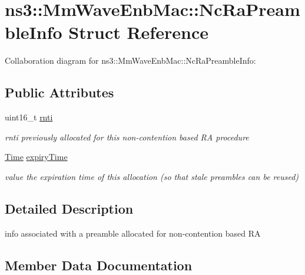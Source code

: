 \hypertarget{structns3_1_1MmWaveEnbMac_1_1NcRaPreambleInfo}{}\section{ns3\+:\+:Mm\+Wave\+Enb\+Mac\+:\+:Nc\+Ra\+Preamble\+Info Struct Reference}
\label{structns3_1_1MmWaveEnbMac_1_1NcRaPreambleInfo}


Collaboration diagram for ns3\+:\+:Mm\+Wave\+Enb\+Mac\+:\+:Nc\+Ra\+Preamble\+Info\+:
\subsection*{Public Attributes}
\begin{DoxyCompactItemize}
\item 
uint16\+\_\+t \hyperlink{structns3_1_1MmWaveEnbMac_1_1NcRaPreambleInfo_a7dfb57ed2aefe13ffc1753a4609b4150}{rnti}
\begin{DoxyCompactList}\small\item\em rnti previously allocated for this non-\/contention based RA procedure \end{DoxyCompactList}\item 
\hyperlink{classns3_1_1Time}{Time} \hyperlink{structns3_1_1MmWaveEnbMac_1_1NcRaPreambleInfo_a2794a7435490c296f60006f83e690fa4}{expiry\+Time}
\begin{DoxyCompactList}\small\item\em value the expiration time of this allocation (so that stale preambles can be reused) \end{DoxyCompactList}\end{DoxyCompactItemize}


\subsection{Detailed Description}
info associated with a preamble allocated for non-\/contention based RA 

\subsection{Member Data Documentation}
